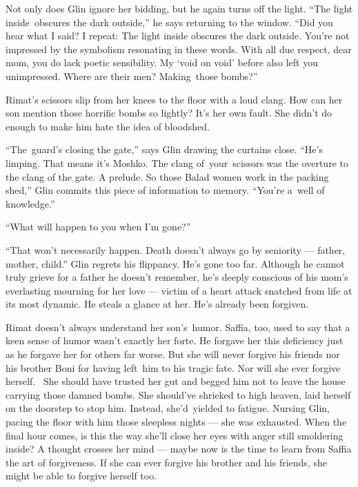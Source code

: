 \documentclass[twoside,11pt]{book}
\begin{document}
{{Not only does Glin
}ignore{ her bidding, but he again turns off the light. ``The light
inside~o}bscures {the dark outside,{}'' he says returning to the
window. ``Did you hear what I said? I
repeat}{:}{ The light inside
}obscures{ the dark outside. You're not impressed by the symbolism
resonating in these words. With all due respect, }dear mom, {you do
lack poetic sensibility. My `void on void' }before also left you
unimpressed.{ Where are their men?
}Making{~those bombs?''}

Rimat's scissors slip from her knees to the floor with a loud clang. How can her son mention those horrific bombs so
lightly? It's her own fault. She didn't do enough to make him hate the idea of bloodshed.

``The~guard's closing the gate,{}'' says Glin drawing the curtains close. {}``He's limping. That means
it's Moshko. The clang of~your~scissors was the overture to the clang of the gate. A prelude. So those Balad women
work in the packing shed,{}'' Glin commits this piece of information to memory. ``You're a~well of
knowledge.''

``What will happen to you when I'm gone?''

``That won't necessarily happen. Death doesn't always go by seniority --- father, mother, child.'' Glin regrets his
flippancy. He's gone too far. Although he cannot truly grieve for a father he doesn't remember, he's deeply
conscious of his mom's everlasting mourning for her love ---  victim of a heart attack snatched from life at its
most dynamic. He steals a glance at her. He's already been forgiven.

{Rimat doesn't always understand her son's~humor. Saffia, too, used to
say that a keen sense of humor wasn't exactly her forte. }He forgave her this deficiency just as he forgave her for
others far worse. But she will never forgive his friends nor his brother Boni for having left~him to his tragic fate.
Nor will she ever forgive herself.~ She should have trusted her gut and begged him not to leave the house carrying
those damned bombs. She should've shrieked to high heaven, laid herself on the doorstep to stop him. Instead,
she'd~yielded to fatigue. Nursing Glin, pacing the floor with him those sleepless nights --- she was exhausted. When
the final hour comes, is this the way she'll close her eyes with anger still smoldering inside? A thought crosses
her mind --- maybe now is the time to learn from Saffia the art of forgiveness. If she can ever forgive his brother
and{ his friends, she might be able to forgive herself too. }

}
\end{document}
